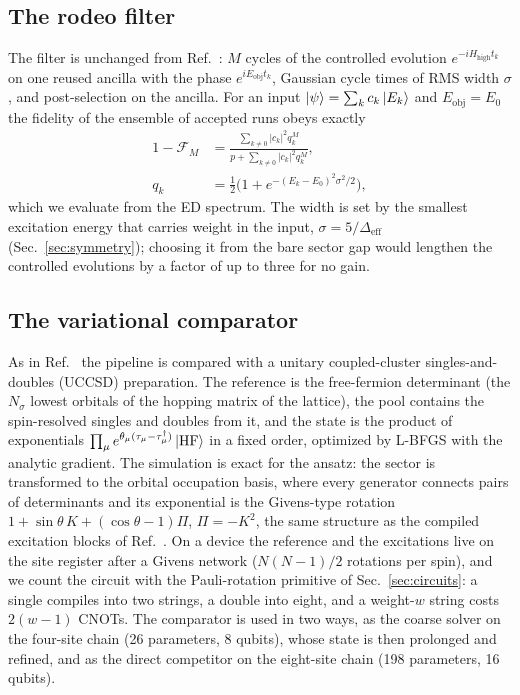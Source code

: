 \documentclass[
  aps,
  prc,
  reprint,
  superscriptaddress,
  floatfix,
  nofootinbib
]{revtex4-2}
\newcommand{\Hhigh}{H_{\mathrm{high}}}
\newcommand{\Eobj}{E_{\mathrm{obj}}}
\newcommand{\Deff}{\Delta_{\mathrm{eff}}}
\begin{document}
\subsection{The rodeo filter}
\label{sec:rodeo}
The filter is unchanged from Ref.~\cite{EigenQPairing2026}: $M$ cycles of
the controlled evolution $e^{-i\Hhigh t_k}$ on one reused ancilla with the
phase $e^{i\Eobj t_k}$, Gaussian cycle times of RMS width $\sigma$, and
post-selection on the ancilla.  For an input
$\ket\psi=\sum_kc_k\ket{E_k}$ and $\Eobj=E_0$ the fidelity of the ensemble
of accepted runs obeys exactly
\begin{align}
  1-\mathcal F_M&=\frac{\sum_{k\neq0}|c_k|^2q_k^M}{p+\sum_{k\neq0}|c_k|^2q_k^M},\nonumber\\
  q_k&=\tfrac12\big(1+e^{-(E_k-E_0)^2\sigma^2/2}\big),
  \label{eq:fid}
\end{align}
which we evaluate from the ED spectrum.  The width is set by the smallest
excitation energy that carries weight in the input,
$\sigma=5/\Deff$ (Sec.~\ref{sec:symmetry}); choosing it from the bare sector
gap would lengthen the controlled evolutions by a factor of up to three for
no gain.

\subsection{The variational comparator}
\label{sec:uccsd}
As in Ref.~\cite{EigenQPairing2026} the pipeline is compared with a unitary
coupled-cluster singles-and-doubles (UCCSD) preparation.  The reference is
the free-fermion determinant (the $N_\sigma$ lowest orbitals of the hopping
matrix of the lattice), the pool contains the spin-resolved singles and
doubles from it, and the state is the product of exponentials
$\prod_\mu e^{\theta_\mu(\tau_\mu-\tau_\mu^\dagger)}\ket{\rm HF}$ in a fixed
order, optimized by L-BFGS with the analytic gradient.  The simulation is
exact for the ansatz: the sector is transformed to the orbital occupation
basis, where every generator connects pairs of determinants and its
exponential is the Givens-type rotation
$1+\sin\theta\,K+(\cos\theta-1)\Pi$, $\Pi=-K^2$, the same structure as the
compiled excitation blocks of Ref.~\cite{EigenQPairing2026}.  On a device the
reference and the excitations live on the site register after a Givens
network ($N(N-1)/2$ rotations per spin), and we count the circuit with the
Pauli-rotation primitive of Sec.~\ref{sec:circuits}: a single compiles into
two strings, a double into eight, and a weight-$w$ string costs $2(w-1)$ CNOTs.
The comparator is used in two ways, as the coarse solver on the four-site
chain (26 parameters, 8 qubits), whose state is then prolonged and refined,
and as the direct competitor on the eight-site chain (198 parameters, 16
qubits).
\end{document}
